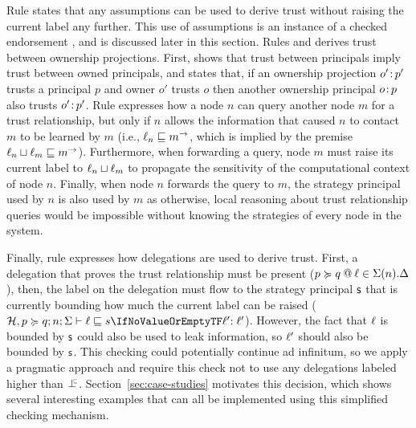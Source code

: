 Rule  states that any assumptions can be used to derive trust without raising the current label any further. This use of assumptions is an instance of a checked endorsement \cite{Chong:2007:SWA:1294261.1294265, DBLP:journals/corr/abs-1107-5594}, and is discussed later in this section.
Rules  and  derives trust between ownership projections. First,  shows that trust between principals imply trust between owned principals, and  states that, if an ownership projection $o' \colon \!p'$ trusts a principal $p$ and owner $o'$ trusts $o$ then another ownership principal $o \colon \!p$ also trusts $o' \colon \!p'$.
Rule  expresses how a node $n$ can query another node $m$ for a trust relationship, but only if $n$ allows the information that caused $n$ to contact $m$ to be learned by $m$ (i.e., $\ell_n \sqsubseteq m^{\rightarrow}$, which is implied by the premise $\ell_n \sqcup \ell_m \sqsubseteq m^{\rightarrow}$). Furthermore, when forwarding a query, node $m$ must raise its current label to $\ell_n \sqcup \ell_m$ to propagate the sensitivity of the computational context of node $n$. Finally, when node $n$ forwards the query to $m$, the strategy principal used by $n$ is also used by $m$ as otherwise, local reasoning about trust relationship queries would be impossible without knowing the strategies of every node in the system.

Finally, rule  expresses how delegations are used to derive trust. First, a delegation that proves the trust relationship must be present ($p \succcurlyeq q \mathbin{@} \ell \in \Sigma(n).\Delta$), then, the label on the delegation must flow to the strategy principal $\stratelem$ that is currently bounding how much the current label can be raised ($\flowstoquery{\Assumps, p \actsfor q; n; \env}{\level}{s}{\level'}$). However, the fact that $\ell$ is bounded by $\stratelem$ could also be used to leak information, so $\ell'$ should also be bounded by $\stratelem$. This checking could potentially continue ad infinitum, so we apply a pragmatic approach and require this check not to use any delegations labeled higher than $\botinfoflow$. Section~\ref{sec:case-studies} motivates this decision, which shows several interesting examples that can all be implemented using this simplified checking mechanism.

